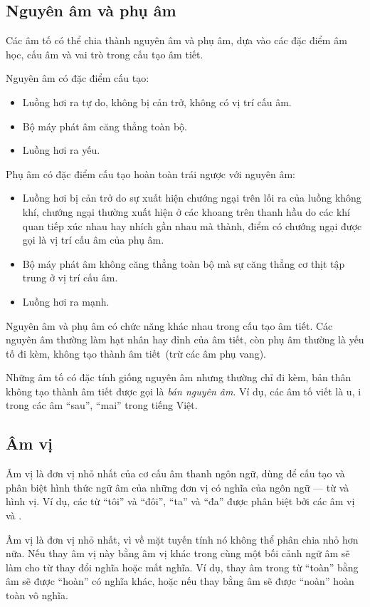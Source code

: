 \documentclass[a4paper,oneside,14pt]{extbook} %
\begin{document}
\subsection{Nguyên âm và phụ âm}

Các âm tố có thể chia thành nguyên âm và phụ âm, dựa vào các đặc điểm
âm học, cấu âm và vai trò trong cấu tạo âm tiết.

Nguyên âm có đặc điểm cấu tạo:
\begin{itemize}
\item Luồng hơi ra tự do, không bị cản trở, không có vị trí cấu âm.
\item Bộ máy phát âm căng thẳng toàn bộ.
\item Luồng hơi ra yếu.
\end{itemize}

Phụ âm có đặc điểm cấu tạo hoàn toàn trái ngược với nguyên âm:
\begin{itemize}
\item Luồng hơi bị cản trở do sự xuất hiện chướng ngại trên lối ra của
  luồng không khí, chướng ngại thường xuất hiện ở các khoang trên
  thanh hầu do các khí quan tiếp xúc nhau hay nhích gần nhau mà thành,
  điểm có chướng ngại được gọi là vị trí cấu âm của phụ âm.
\item Bộ máy phát âm không căng thẳng toàn bộ mà sự căng thẳng cơ thịt
  tập trung ở vị trí cấu âm.
\item Luồng hơi ra mạnh.
\end{itemize}

Nguyên âm và phụ âm có chức năng khác nhau trong cấu tạo âm tiết. Các
nguyên âm thường làm hạt nhân hay đỉnh của âm tiết, còn phụ âm thường
là yếu tố đi kèm, không tạo thành âm tiết~(trừ các âm phụ vang).

Những âm tố có đặc tính giống nguyên âm nhưng thường chỉ đi kèm, bản
thân không tạo thành âm tiết được gọi là {\em bán nguyên âm}. Ví dụ,
các âm tố viết là u, i trong các âm ``sau'', ``mai'' trong tiếng Việt.


\subsection{Âm vị}

Âm vị là đơn vị nhỏ nhất của cơ cấu âm thanh ngôn ngữ, dùng để cấu tạo
và phân biệt hình thức ngữ âm của những đơn vị có nghĩa của ngôn ngữ
--- từ và hình vị. Ví dụ, các từ ``tôi'' và ``đôi'', ``ta'' và ``đa''
được phân biệt bởi các âm vị  và .

Âm vị là đơn vị nhỏ nhất, vì về mặt tuyến tính nó không thể phân chia
nhỏ hơn nữa. Nếu thay âm vị này bằng âm vị khác trong cùng một bối
cảnh ngữ âm sẽ làm cho từ thay đổi nghĩa hoặc mất nghĩa. Ví dụ, thay
âm  trong từ ``toàn'' bằng âm  sẽ được
``hoàn'' có nghĩa khác, hoặc nếu thay bằng âm  sẽ được
``noàn'' hoàn toàn vô nghĩa.
\end{document}
